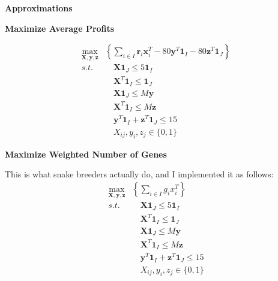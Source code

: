 \documentclass[grey,handout]{beamer}
\renewcommand{\frametitle}[1]{\begin{center}\textbf{#1}\end{center}}
\begin{document}
\begin{frame}
  \frametitle{Approximations}
  \end{frame}
  \begin{frame}
  \frametitle{Maximize Average Profits}
  \begin{align*}
      \max_{\mathbf{X},\mathbf{y},\mathbf{z}}&\left\{ \sum_{i\in I}\mathbf r_i \mathbf x_i^T - 80\mathbf y^T\mathbf 1_I - 80\mathbf z^T\mathbf 1_J \right\}\\
      s.t. & \quad\mathbf X\mathbf 1_J \leq 5\mathbf 1_I \\
      &\quad \mathbf X^T \mathbf 1_I \leq \mathbf1_J\\
      &\quad \mathbf X \mathbf1_J\leq M\mathbf y\\
      & \quad\mathbf X^T\mathbf 1_I \leq M\mathbf z\\
      &\quad \mathbf y^T\mathbf 1_I + \mathbf z^T\mathbf 1_J \leq 15\\
      & \quad X_{ij}, y_i, z_j \in \{0,1\}
    \end{align*}
    \end{frame}
    \begin{frame}
    \frametitle{Maximize Weighted Number of Genes}
    This is what snake breeders actually do, and I implemented it as follows:
    \begin{align*}
    \max_{\mathbf{X},\mathbf{y},\mathbf{z}}&\left\{ \sum_{i\in I} g_i x_i^T  \right\}\\
      s.t. & \quad\mathbf X\mathbf 1_J \leq 5\mathbf 1_I \\
      &\quad \mathbf X^T \mathbf 1_I \leq \mathbf1_J\\
      &\quad \mathbf X \mathbf1_J\leq M\mathbf y\\
      & \quad\mathbf X^T\mathbf 1_I \leq M\mathbf z\\
      &\quad \mathbf y^T\mathbf 1_I + \mathbf z^T\mathbf 1_J \leq 15\\
      & \quad X_{ij}, y_i, z_j \in \{0,1\}
    \end{align*}
    \end{frame}
\end{document}
